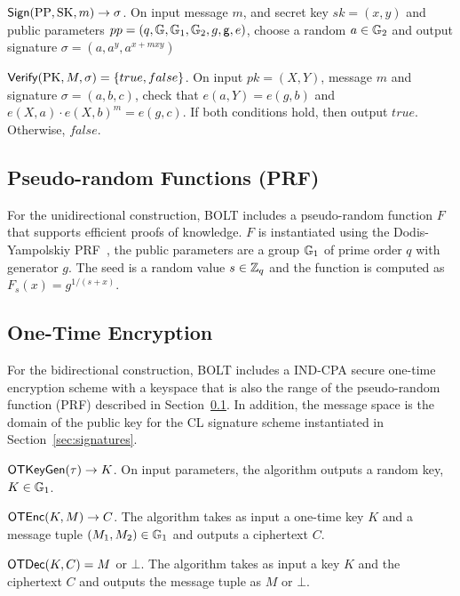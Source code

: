 \documentclass[11pt]{report}
\begin{document}
\medskip \noindent
${\sf Sign}(\mathrm{PP}, \mathrm{SK}, m) \rightarrow \sigma$. On input message $m$, and secret key $sk = (x, y)$ and public parameters $pp = (q, \mathbb{G}, \mathbb{G}_1, \mathbb{G}_2, g, {\sf g}, e)$, choose a random $a \in \mathbb{G}_2$ and output signature $\sigma = (a, a^y, a^{x + mxy})$

\medskip \noindent
${\sf Verify}(\mathrm{PK}, M, \sigma) =  \{true, false\}$. On input $pk = (X, Y)$, message $m$ and signature $\sigma = (a, b, c)$, check that $e(a, Y) = e(g, b)$ and $e(X, a) \cdot e(X, b)^m = e(g, c)$. If both conditions hold, then output $true$. Otherwise, $false$.


\subsection{Pseudo-random Functions (PRF)}
\label{sec:prf}

For the unidirectional construction, BOLT includes a pseudo-random function $F$ that supports efficient proofs of knowledge. $F$ is instantiated using the Dodis-Yampolskiy PRF~\cite{DY05}, the public parameters are a group $\mathbb{G}_1$ of prime order $q$ with generator $g$. The seed is a random value $s \in \mathbb{Z}_q$ and the function is computed as $F_{s}(x) = g^{1/(s+x)}$.
 
\subsection{One-Time Encryption} 
\label{sec:ote}

For the bidirectional construction, BOLT includes a IND-CPA secure one-time encryption scheme with a keyspace that is also the range of the pseudo-random function (PRF) described in Section~\ref{sec:prf}. In addition, the message space is the domain of the public key for the CL signature scheme instantiated in Section~\ref{sec:signatures}.

\medskip \noindent
${\sf OTKeyGen}(\tau) \rightarrow K$. On input parameters, the algorithm outputs a random key, $K \in \mathbb{G}_1$.

\medskip \noindent
${\sf OTEnc}(K, M) \rightarrow C$. The algorithm takes as input a one-time key $K$ and a message tuple $(M_1, M_2) \in \mathbb{G}_1$ and outputs a ciphertext $C$.
 
 \medskip \noindent
${\sf OTDec}(K, C) = M$ or $\bot$. The algorithm takes as input a key $K$ and the ciphertext $C$ and outputs the message tuple as $M$ or $\bot$.
\end{document}
